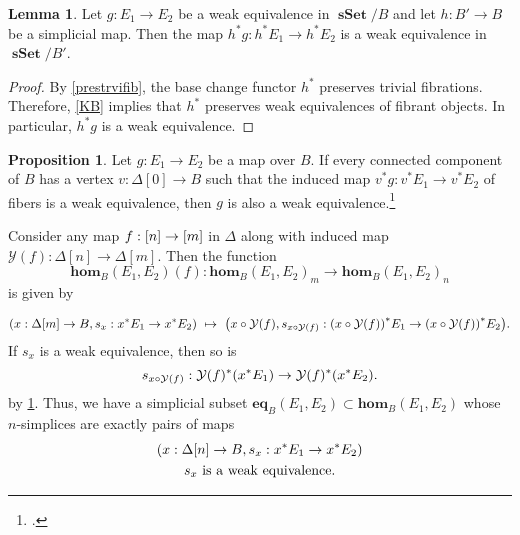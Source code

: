 \documentclass[10pt,letterpaper,cm]{nupset}
\theoremstyle{definition}
\theoremstyle{theorem}
\newtheorem{lemma}[definition]{Lemma}
\newtheorem{prop}[definition]{Proposition}
\theoremstyle{remark}
\newcommand{\0}{\mathbf{0}}
\newcommand{\1}{\mathbf{1}}
\newcommand{\2}{\mathbf{2}}
\DeclareMathOperator{\sset}{\mathbf{sSet}}
\begin{document}
\begin{lemma}\label{alsowe}
Let $g : E_1 \to E_2$ be a weak equivalence in $\sset/B$ and let $h: B' \to B$ be a simplicial map. Then the map $ h^{\ast}{g}: h^{\ast}{E_1} \to h^{\ast}{E_2}$ is a weak equivalence in $\sset/B'$.
\end{lemma}
\begin{proof}
By \cref{prestrvifib}, the base change functor $h^{\ast}$ preserves trivial fibrations. Therefore, \cref{KB} implies that $h^{\ast}$ preserves weak equivalences of fibrant objects. In particular, $h^{\ast}{g}$ is a weak equivalence.
\end{proof}

\begin{prop}\label{thenweq}
Let  $g : E_1 \to E_2$ be a map over $B$. If every connected component of $B$ has a vertex $v: \Delta[0] \to B$ such that the induced map $v^{\ast}{g}: v^{\ast}{E_1} \to v^{\ast}{E_2}$ of fibers is a weak equivalence, then $g$ is also a weak equivalence.\footnote{\autocite[Lemma 3.2.7]{KL}.}
\end{prop}

\smallskip

Consider any map $f: \mleft[n\mright] \to \mleft[m\mright]$ in $\varDelta$ along with induced map $\mathcal{Y}(f) : \Delta[n] \to \Delta[m]$. Then the function $$\mathbf{hom}_B(E_1, E_2)(f) : \mathbf{hom}_B(E_1, E_2)_m \to \mathbf{hom}_B(E_1, E_2)_n$$ is given by 

\[
\mleft(x: \Delta[m] \to B, s_x: x^{\ast}{E_{1}} \to x^{\ast}{E_{2}}\mright) \ \mapsto \ \mleft(x \circ \mathcal{Y}(f), s_{x \circ \mathcal{Y}(f)} : \mleft(x \circ \mathcal{Y}(f)\mright)^{\ast}{E_{1}} \to \mleft(x \circ \mathcal{Y}(f)\mright)^{\ast}{E_{2}}\mright).
\]
If $s_x$ is a weak equivalence, then so is
\[
s_{x \circ \mathcal{Y}(f)} : \mathcal{Y}(f)^{\ast}\mleft(x^{\ast}{E_{1}}\mright) \to  \mathcal{Y}(f)^{\ast}\mleft(x^{\ast}{E_{2}}\mright).
\] by \cref{alsowe}. Thus, we have a simplicial subset $\mathbf{eq}_B(E_1, E_2) \subset \mathbf{hom}_B(E_1, E_2)$ whose $n$-simplices are exactly pairs of maps
\begin{gather*}
\mleft(x: \Delta[n]\to B, s_x : x^{\ast}{E_1} \to x^{\ast}{E_2}\mright)
\\ s_x \text{ is a weak equivalence}.
\end{gather*}

\smallskip
\end{document}
